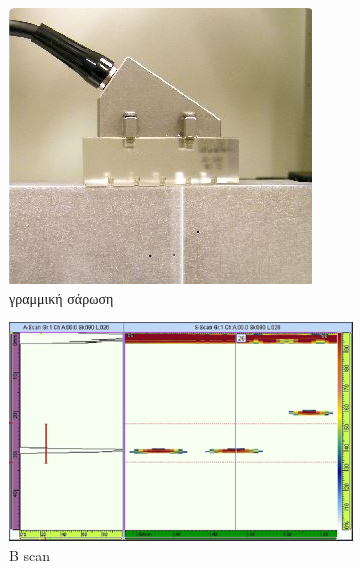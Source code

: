 \documentclass[12pt,a4paper]{book}
\begin{document}
\begin{figure}
	\centering
	\begin{subfigure}[b]{0.4\textwidth}
		\includegraphics[width=\textwidth]{linear_scan}
		\caption{γραμμική σάρωση}
		\label{linear_scan}
	\end{subfigure}	
	\begin{subfigure}[b]{0.4\textwidth}
		\includegraphics[width=\textwidth]{b_scan}
		\caption{B scan}
		\label{b_scan}
	\end{subfigure}
	\begin{subfigure}[b]{0.4\textwidth}

\end{subfigure}
\end{figure}
\end{document}
